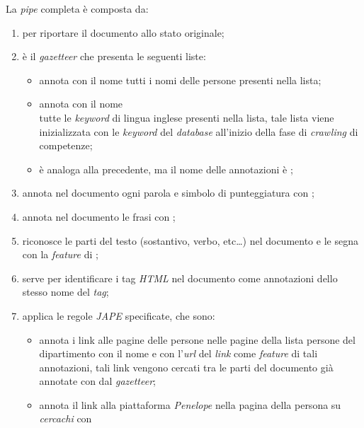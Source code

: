 \documentclass[tesi.tex]{subfiles}
\begin{document}
La \emph{pipe} completa \`e composta da:
\begin{enumerate}
\item {} per riportare il documento allo stato
  originale;
\item {} \`e il \emph{gazetteer} che presenta le
  seguenti liste:
  \begin{itemize}
  \item {} annota con il nome 
    tutti i nomi delle persone presenti nella lista;
  \item {} annota con il nome\\
     tutte le \emph{keyword} di lingua inglese
    presenti nella lista, tale lista viene inizializzata con le
    \emph{keyword} del \emph{database} all'inizio della fase di
    \emph{crawling} di competenze;
  \item {} \`e analoga alla
    precedente, ma il nome delle annotazioni \`e
    ;
  \end{itemize}
\item {} annota nel documento ogni parola e
  simbolo di punteggiatura con ;
\item {} annota nel documento le frasi con
  ;
\item {} riconosce le parti del testo (sostantivo,
  verbo, etc\dots) nel documento e le segna con la \emph{feature}
   di ;
\item {} serve per identificare i tag
  \emph{HTML} nel documento come annotazioni dello stesso nome del
  \emph{tag};
\item {} applica le regole
  \emph{JAPE} specificate, che sono:
  \begin{itemize}
  \item {} annota i link alle pagine delle persone
    nelle pagine della lista persone del dipartimento con il nome
     e con l'\emph{url} del \emph{link} come
    \emph{feature}  di tali annotazioni, tali link vengono
    cercati tra le parti del documento gi\`a annotate con
     dal \emph{gazetteer};
  \item {} annota il link alla piattaforma
    \emph{Penelope} nella pagina della persona su \emph{cercachi} con

\end{itemize}
\end{enumerate}
\end{document}
